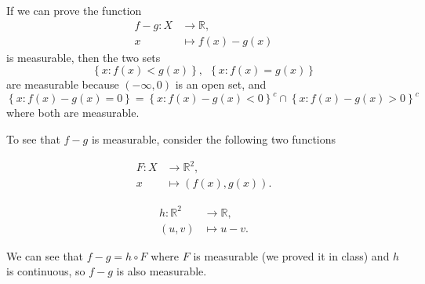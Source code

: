 \documentclass[letterpaper, 12pt]{article}
\begin{document}
\begin{solution}
If we can prove the function 
\begin{align*}
     f-g:X&\rightarrow \mathbb{R},\\ 
         x&\mapsto f(x)-g(x) 
\end{align*}
is measurable, then the two sets
\[\left\{ x:f(x)<g(x) \right\},\ \ \left\{ x:f(x)=g(x) \right\}\]
are measurable because \((-\infty,0)\) is an open set, and 
\[\left\{ x:f(x)-g(x)=0 \right\}=\left\{ x:f(x)-g(x)<0 \right\}^c\cap \left\{ x:f(x)-g(x)>0 \right\}^c\]
where both are measurable. 

To see that \(f-g\) is measurable, consider the following two functions 

\noindent
\begin{minipage}[t]{.48\textwidth}
  \begin{align*}
    F: X& \rightarrow \mathbb{R}^2, \\
    x &\mapsto (f(x),g(x)).
  \end{align*}
\end{minipage}\hfill
\begin{minipage}[t]{.48\textwidth}
  \begin{align*}
    h: \mathbb{R}^2 &\rightarrow \mathbb{R}, \\
    (u,v) &\mapsto u-v.
  \end{align*}
\end{minipage}

\vspace{.3cm}

We can see that \(f-g=h\circ F\) where \(F\) is measurable (we proved it in class) and \(h\) is continuous, so \(f-g\) is also measurable.
\end{solution}

\begin{comment}
\noindent\rule{7in}{2.8pt}
\begin{problem}{1.6}
Let \(X\) be an uncountable set, let \(\mathfrak{M}\) be the collection of all sets \(E\subset X\) such that either \(E\) or \(E^c\) is at most countable, and define \(\mu(E)=0\) in the first case, \(\mu(E)=1\) in the second. Prove that \(\mathfrak{M}\) is a \(\sigma\)-algebra in \(X\) and that \(\mu\) is a measure on \(\mathfrak{M}\). Describe the corresponding measurable functions and their integrals.
\end{problem}
\begin{solution}

\end{solution}
\end{comment}
\end{document}
